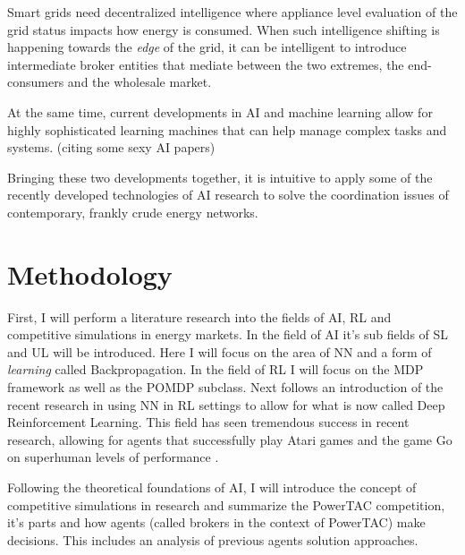 Smart grids need decentralized intelligence where appliance level evaluation of the grid status impacts how energy is
consumed. When such intelligence shifting is happening towards the \emph{edge} of the grid, it can be intelligent to
introduce intermediate broker entities that mediate between the two extremes, the end-consumers and the wholesale
market.

At the same time, current developments in AI and machine learning allow for highly sophisticated learning machines that
can help manage complex tasks and systems. (citing some sexy AI papers)

Bringing these two developments together, it is intuitive to apply some of the recently developed technologies of 
\ac {AI} research to solve the coordination issues of contemporary, frankly crude energy networks. 


\section{Methodology}
First, I will perform a literature research into the fields of \ac{AI}, \ac{RL} and competitive simulations in energy
markets. In the field of AI
it's sub fields of \ac {SL}  and \ac {UL}  will be introduced. Here I will focus on the area of \ac{NN} and a form of
\emph{learning}  called Backpropagation. In the field of \ac{RL} I will focus on the \ac{MDP} framework as well as the
\ac{POMDP} subclass.  Next follows an introduction of the recent research in using \ac{NN} in \ac{RL} settings to allow
for what is now called Deep Reinforcement Learning. This field has seen tremendous success in recent research, allowing
for agents that successfully play Atari games and the game Go on superhuman levels of performance 
\citep{proximalpolicyopt, silver2016mastering}.


Following the theoretical foundations of \ac{AI},  I will introduce the concept of competitive simulations in research
and summarize the \ac{PowerTAC} competition, it's parts and how agents (called brokers in the context of \ac{PowerTAC})
make decisions. This includes an analysis of previous agents solution approaches. 

